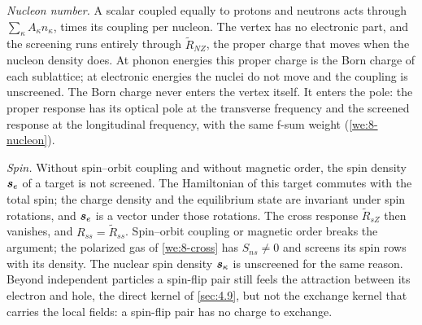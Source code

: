 \emph{Nucleon number.} A scalar coupled equally to protons and neutrons acts through $\sum_\kappa A_\kappa n_\kappa$, times its coupling per nucleon. The vertex has no electronic part, and the screening runs entirely through $\tilde R_{NZ}$, the proper charge that moves when the nucleon density does. At phonon energies this proper charge is the Born charge of each sublattice; at electronic energies the nuclei do not move and the coupling is unscreened. The Born charge never enters the vertex itself. It enters the pole: the proper response has its optical pole at the transverse frequency and the screened response at the longitudinal frequency, with the same f-sum weight (\cref{we:8-nucleon}).

\emph{Spin.} Without spin--orbit coupling and without magnetic order, the spin density $\bm{s}_e$ of a target is not screened. The Hamiltonian of this target commutes with the total spin; the charge density and the equilibrium state are invariant under spin rotations, and $\bm{s}_e$ is a vector under those rotations. The cross response $\tilde R_{sZ}$ then vanishes, and $R_{ss} = \tilde R_{ss}$. Spin--orbit coupling or magnetic order breaks the argument; the polarized gas of \cref{we:8-cross} has $S_{ns} \ne 0$ and screens its spin rows with its density. The nuclear spin density $\bm{s}_\kappa$ is unscreened for the same reason. Beyond independent particles a spin-flip pair still feels the attraction between its electron and hole, the direct kernel of \cref{sec:4.9}, but not the exchange kernel that carries the local fields: a spin-flip pair has no charge to exchange.

